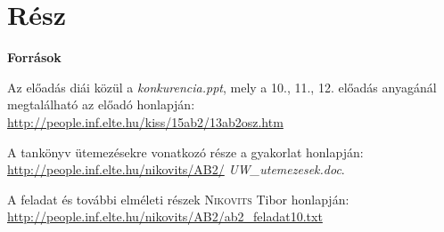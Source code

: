 \documentclass[a4paper,11.5pt, table]{article}
\begin{document}
\newpage

	\section{Rész}

	\textbf{Források}
	\begin{compactitem}
		\item Az előadás diái közül a \textit{konkurencia.ppt}, mely a 10., 11., 12. előadás anyagánál megtalálható az előadó honlapján: \url{http://people.inf.elte.hu/kiss/15ab2/13ab2osz.htm}
		 \item A tankönyv ütemezésekre vonatkozó része a gyakorlat honlapján: \url{http://people.inf.elte.hu/nikovits/AB2/} \textit{UW\_utemezesek.doc}.
		\item A feladat és további elméleti részek \textsc{Nikovits} Tibor honlapján: \url{http://people.inf.elte.hu/nikovits/AB2/ab2_feladat10.txt}
	\end{compactitem}
\end{document}
